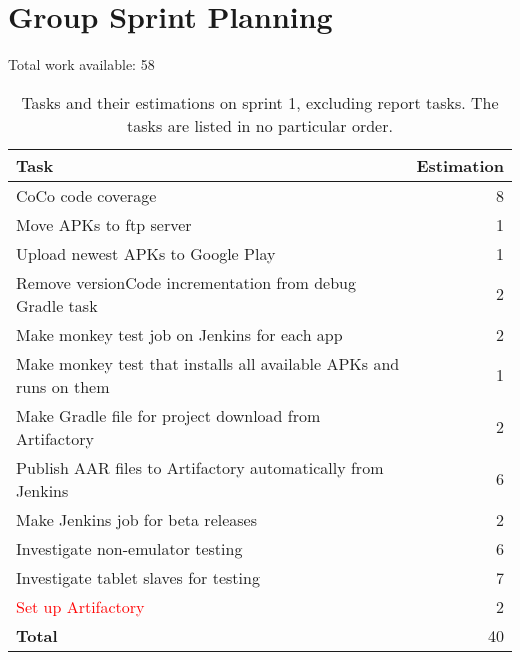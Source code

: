 \section{Group Sprint Planning}
Total work available: 58

\begin{table}[htp]%
  \centering
  \begin{tabular}{lr}
    \textbf{Task} & \textbf{Estimation} \\
    \toprule
    CoCo code coverage & 8 \\
    Move APKs to ftp server & 1 \\
    Upload newest APKs to Google Play & 1 \\
    Remove versionCode incrementation from debug Gradle task & 2 \\
    Make monkey test job on Jenkins for each app & 2 \\
    Make monkey test that installs all available APKs and runs on them & 1 \\
    Make Gradle file for project download from Artifactory & 2 \\
    Publish AAR files to Artifactory automatically from Jenkins & 6 \\
    Make Jenkins job for beta releases & 2 \\
    Investigate non-emulator testing & 6 \\
    Investigate tablet slaves for testing & 7 \\
    \textcolor{red}{Set up Artifactory} & 2 \\
    \midrule
    \textbf{Total} & 40 \\
    \bottomrule
  \end{tabular}
\caption{Tasks and their estimations on sprint 1, excluding report tasks. The tasks are listed in no particular order.}
\label{tab:sprint1_tasks}
\end{table}

